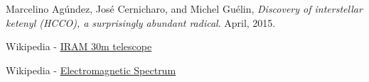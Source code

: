 \documentclass[12 pt]{article}
\begin{document}
	\begin{thebibliography}{999}
 	 Marcelino Agúndez, José Cernicharo, and Michel Guélin, \emph{Discovery of interstellar ketenyl (HCCO), a surprisingly abundant radical}.
 	 April, 2015.
	
	Wikipedia - \href{https://en.wikipedia.org/wiki/IRAM_30m_telescope}{IRAM 30m telescope}
	
	Wikipedia - \href{https://en.wikipedia.org/wiki/Electromagnetic_spectrum}{Electromagnetic Spectrum}	
	\end{thebibliography}
	
\end{document}
